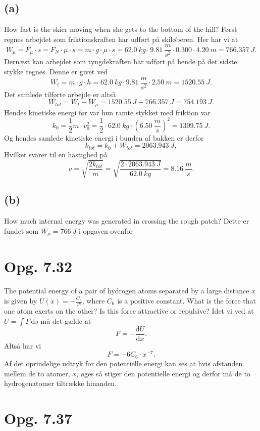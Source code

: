 \documentclass[12pt]{article}
\begin{document}
\subsection*{(a)}
How fast is the skier moving when she gets to the bottom of the hill?
\bigbreak
Først regnes arbejdet som friktionskraften har udført på skiløberen. Her har vi at
\[
W_\mu = F_\mu \cdot s = F_N \cdot \mu \cdot s = m\cdot g \cdot \mu \cdot s = \qty{62,0}{kg}\cdot \qty{9,81}{\frac{m}{s^2}}\cdot \num{0,300}\cdot \qty{4,20}{m} = \qty{766,357}{J}
.\] 
Dernæst kan arbejdet som tyngdekraften har udført på hende på det sidste stykke regnes. Denne er givet ved
\[
W_t = m\cdot g\cdot h = \qty{62,0}{kg}\cdot \qty{9,81}{\frac{m}{s^2}}\cdot \qty{2,50}{m} = \qty{1520,55}{J}
.\] 
Det samlede tilførte arbejde er altså
\[
W_{tot} = W_t - W_\mu = \qty{1520,55}{J} - \qty{766,357}{J} = \qty{754,193}{J}
.\] 
Hendes kinetiske energi før var hun ramte stykket med friktion var
\[
k_0 = \frac{1}{2}m\cdot v_0^2 = \frac{1}{2}\cdot \qty{62,0}{kg}\cdot \left( \qty{6,50}{\frac{m}{s}} \right)^2 = \qty{1309,75}{J}
.\] 
Og hendes samlede kinetiske energi i bunden af bakken er derfor
\[
k_{tot} = k_0 + W_{tot} = \qty{2063,943}{J}
,\] 
Hvilket svarer til en hastighed på
\[
v = \sqrt{\frac{2k_{tot}}{m}} =  \sqrt{\frac{2\cdot \qty{2063,943}{J}}{\qty{62,0}{kg}}} = \qty{8,16}{\frac{m}{s}}
.\] 

\subsection*{(b)}
How much internal energy was generated in crossing the rough patch?
\bigbreak
Dette er fundet som $W_\mu = \qty{766}{J}$ i opgaven ovenfor
  

\section*{Opg. 7.32}
The potential energy of a pair of hydrogen atoms separated by a large distance $x$ is given by $U(x) = -\frac{C_6}{x^6}$, where $C_6$ is a positive constant. What is the force that one atom exerts on the other? Is this force attractive or repulsive?
\bigbreak
Idet vi ved at $U = \int F \, \mathrm{d}s$ må det gælde at
\[
F = - \frac{\mathrm{d}U}{\mathrm{d}x} 
.\] 
Altså har vi
\[
F = -6C_6\cdot x^{-7}
.\]
Af det oprindelige udtryk for den potentielle energi kan ses at hvis afstanden mellem de to atomer, $x$, øges så stiger den potentielle energi og derfor må de to hydrogenatomer tiltrække hinanden.


\section*{Opg. 7.37}
\end{document}
